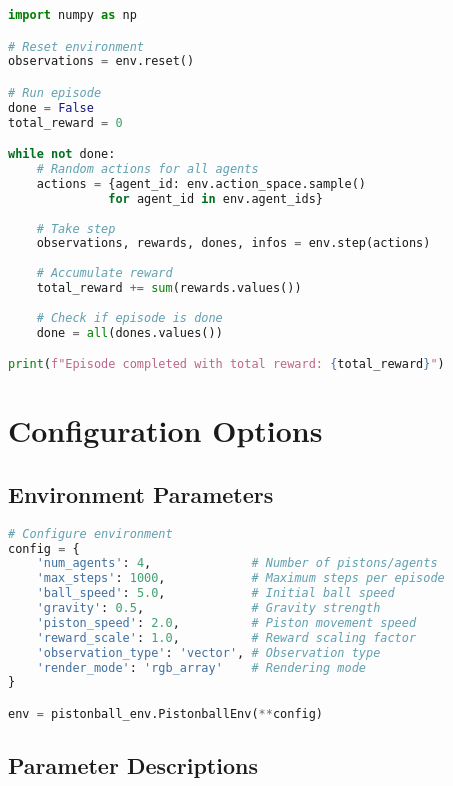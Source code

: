 \begin{lstlisting}[language=python, caption=Simple Episode]
import numpy as np

# Reset environment
observations = env.reset()

# Run episode
done = False
total_reward = 0

while not done:
    # Random actions for all agents
    actions = {agent_id: env.action_space.sample() 
              for agent_id in env.agent_ids}
    
    # Take step
    observations, rewards, dones, infos = env.step(actions)
    
    # Accumulate reward
    total_reward += sum(rewards.values())
    
    # Check if episode is done
    done = all(dones.values())

print(f"Episode completed with total reward: {total_reward}")
\end{lstlisting}

\section{Configuration Options}

\subsection{Environment Parameters}

\begin{lstlisting}[language=python, caption=Environment Configuration]
# Configure environment
config = {
    'num_agents': 4,              # Number of pistons/agents
    'max_steps': 1000,            # Maximum steps per episode
    'ball_speed': 5.0,            # Initial ball speed
    'gravity': 0.5,               # Gravity strength
    'piston_speed': 2.0,          # Piston movement speed
    'reward_scale': 1.0,          # Reward scaling factor
    'observation_type': 'vector', # Observation type
    'render_mode': 'rgb_array'    # Rendering mode
}

env = pistonball_env.PistonballEnv(**config)
\end{lstlisting}

\subsection{Parameter Descriptions}

